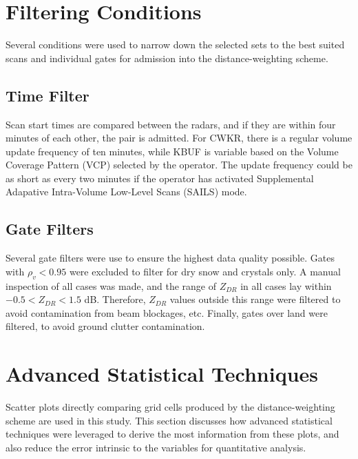 \section{Filtering Conditions}
Several conditions were used to narrow down the selected sets to the best suited scans and individual gates for admission into the distance-weighting scheme.
\subsection{Time Filter}
Scan start times are compared between the radars, and if they are within four minutes of each other, the pair is admitted. For CWKR, there is a regular
volume update frequency of ten minutes, while KBUF is variable based on the Volume Coverage Pattern (VCP) selected by the operator. The update frequency
could be as short as every two minutes if the operator has activated Supplemental Adapative Intra-Volume Low-Level Scans (SAILS) mode.
\subsection{Gate Filters}
Several gate filters were use to ensure the highest data quality possible. Gates with $\rho_{v} < 0.95$ were excluded to filter for dry snow and crystals only. A manual inspection of all cases was made, and the range of $Z_{DR}$ in all cases lay within $-0.5 < Z_{DR} < 1.5$ dB. Therefore, $Z_{DR}$ values outside this range were filtered to avoid contamination from beam blockages, etc. Finally, gates over land were filtered, to avoid ground clutter contamination.
\section{Advanced Statistical Techniques}
Scatter plots directly comparing grid cells produced by the distance-weighting scheme are used in this study. This section discusses how advanced statistical
techniques were leveraged to derive the most information from these plots, and also reduce the error intrinsic to the variables for quantitative analysis.

